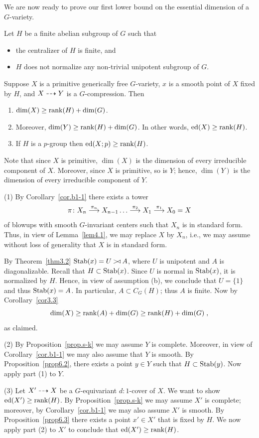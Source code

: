 We are now ready to prove our first lower bound on the essential dimension 
of a $G$-variety.

\begin{thm} \label{thm6.1} 
Let $H$ be a finite abelian subgroup of $G$ such that
\begin{itemize}
\item[(a)] the centralizer of $H$ is finite, and
\item[(b)] $H$ does not normalize any non-trivial unipotent subgroup of $G$.
\end{itemize}
Suppose $X$ is a primitive generically
free $G$-variety, $x$ is a smooth point of $X$ fixed by $H$, and
$X \dasharrow Y$ is a $G$-compression. Then
\begin{enumerate}
\item $\dim(X) \geq \operatorname{rank}(H) + \dim(G)$.
\item Moreover, 
$\dim(Y) \geq \operatorname{rank}(H) + \dim(G)$. In other words, 
$\operatorname{ed}(X) \geq \operatorname{rank}(H)$.
\item If $H$ is a $p$-group then $\operatorname{ed}(X; p) \geq \operatorname{rank}(H)$.
\end{enumerate}
\end{thm}

Note that since $X$ is primitive, $\dim(X)$ is the dimension of every 
irreducible component of $X$.  Moreover, since $X$ is primitive, so is $Y$; 
hence, $\dim(Y)$ is the dimension of
every irreducible component of $Y$.

\smallskip
\begin{pf} 
(1) By Corollary~\ref{cor.b1-1} there exists a tower
\[
\pi\colon X_n \stackrel{\pi_n}{\longrightarrow} X_{n-1}
\dots \stackrel{\pi_2}{\longrightarrow} X_1 \stackrel{\pi_1}{\longrightarrow} X_0 = X
\]
of blowups with smooth $G$-invariant centers such that $X_n$ is 
in standard form. Thus, in view of Lemma~\ref{lem4.1}, we may replace  
$X$ by $X_n$, i.e., we may assume without loss of generality that $X$
is in standard form.

By Theorem~\ref{thm3.2} $\operatorname{Stab}(x) = U \mathbin{{>}\!{\triangleleft}} A$, 
where $U$ is unipotent and $A$ is diagonalizable. Recall that 
$H \subset \operatorname{Stab}(x)$.  Since $U$ is normal
in $\operatorname{Stab}(x)$, it is normalized by $H$. Hence, in view of assumption (b),
we conclude that $U = \{ 1 \}$ and thus $\operatorname{Stab}(x) = A$. In particular,
$A \subset C_G(H)$; thus $A$ is finite. Now by Corollary~\ref{cor3.3} 
$$\dim(X) \geq \operatorname{rank}(A) + \dim(G) \geq \operatorname{rank}(H) + \dim(G) \; , $$
as claimed.

\smallskip
(2) By Proposition~\ref{prop.s-k} we may assume $Y$ is complete.  
Moreover, in view 
of Corollary~\ref{cor.b1-1} we may also assume that $Y$ is smooth.
By Proposition~\ref{prop6.2}, there exists a point $y \in Y$ such 
that $H \subset \operatorname{Stab}(y)$. Now apply part (1) to $Y$.

\smallskip
(3) Let $X' \dasharrow X$ be a $G$-equivariant $d:1$-cover of $X$.
We want to show $\operatorname{ed}(X') \geq \operatorname{rank}(H)$.
By Proposition~\ref{prop.s-k} we may assume $X'$ is complete; moreover, 
by Corollary~\ref{cor.b1-1} we may also assume $X'$ is smooth. 
By Proposition~\ref{prop6.3} there exists a point
$x' \in X'$ that is fixed by $H$. We now apply part (2) to 
$X'$ to conclude that $\operatorname{ed}(X') \geq \operatorname{rank}(H)$.
\end{pf}

